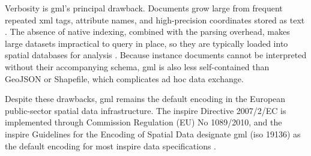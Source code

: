 Verbosity is \acrshort{gml}'s principal drawback. Documents grow large from frequent repeated \acrshort{xml} tags, attribute names, and high-precision coordinates stored as text \parencite{guo2010_effective_gml_documents_compressor}. The absence of native indexing, combined with the parsing overhead, makes large datasets impractical to query in place, so they are typically loaded into spatial databases for analysis \parencite{li2004_gml_storage_spatial_database}. Because instance documents cannot be interpreted without their accompanying schema, \acrshort{gml} is also less self-contained than GeoJSON or Shapefile, which complicates ad hoc data exchange.

Despite these drawbacks, \acrshort{gml} remains the default encoding in the European public-sector spatial data infrastructure. The \acrfull{inspire} Directive 2007/2/EC is implemented through Commission Regulation (EU) No 1089/2010, and the \acrshort{inspire} Guidelines for the Encoding of Spatial Data designate \acrshort{gml} (\acrshort{iso} 19136) as the default encoding for most \acrshort{inspire} data specifications \parencite{ec2010_commission_regulation_1089_inspire, inspire2023_d27_encoding_guidelines}.  



